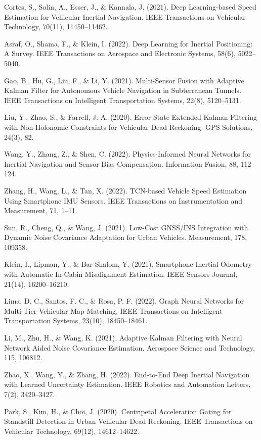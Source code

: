 \documentclass[11pt,a4paper]{article}
\begin{document}
\small
\begin{enumerate}[label={[\arabic*].},leftmargin=0.9cm,itemsep=3.2pt,resume]
\item Cortes, S., Solin, A., Esser, J., \& Kannala, J. (2021). Deep Learning-based Speed Estimation for Vehicular Inertial Navigation. IEEE Transactions on Vehicular Technology, 70(11), 11450--11462.
\item Asraf, O., Shama, F., \& Klein, I. (2022). Deep Learning for Inertial Positioning: A Survey. IEEE Transactions on Aerospace and Electronic Systems, 58(6), 5022--5040.
\item Gao, B., Hu, G., Liu, F., \& Li, Y. (2021). Multi-Sensor Fusion with Adaptive Kalman Filter for Autonomous Vehicle Navigation in Subterranean Tunnels. IEEE Transactions on Intelligent Transportation Systems, 22(8), 5120--5131.
\item Liu, Y., Zhao, S., \& Farrell, J. A. (2020). Error-State Extended Kalman Filtering with Non-Holonomic Constraints for Vehicular Dead Reckoning. GPS Solutions, 24(3), 82.
\item Wang, Y., Zhang, Z., \& Shen, C. (2022). Physics-Informed Neural Networks for Inertial Navigation and Sensor Bias Compensation. Information Fusion, 88, 112--124.
\item Zhang, H., Wang, L., \& Tan, X. (2022). TCN-based Vehicle Speed Estimation Using Smartphone IMU Sensors. IEEE Transactions on Instrumentation and Measurement, 71, 1--11.
\item Sun, R., Cheng, Q., \& Wang, J. (2021). Low-Cost GNSS/INS Integration with Dynamic Noise Covariance Adaptation for Urban Vehicles. Measurement, 178, 109358.
\item Klein, I., Lipman, Y., \& Bar-Shalom, Y. (2021). Smartphone Inertial Odometry with Automatic In-Cabin Misalignment Estimation. IEEE Sensors Journal, 21(14), 16200--16210.
\item Lima, D. C., Santos, F. C., \& Rosa, P. F. (2022). Graph Neural Networks for Multi-Tier Vehicular Map-Matching. IEEE Transactions on Intelligent Transportation Systems, 23(10), 18450--18461.
\item Li, M., Zhu, H., \& Wang, K. (2021). Adaptive Kalman Filtering with Neural Network Aided Noise Covariance Estimation. Aerospace Science and Technology, 115, 106812.
\item Zhao, X., Wang, Y., \& Zhang, H. (2022). End-to-End Deep Inertial Navigation with Learned Uncertainty Estimation. IEEE Robotics and Automation Letters, 7(2), 3420--3427.
\item Park, S., Kim, H., \& Choi, J. (2020). Centripetal Acceleration Gating for Standstill Detection in Urban Vehicular Dead Reckoning. IEEE Transactions on Vehicular Technology, 69(12), 14612--14622.
\end{enumerate}
\vfill
\newpage
\end{document}
